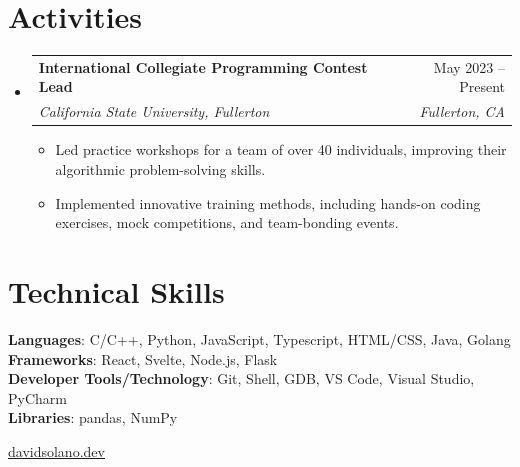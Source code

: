\documentclass[letterpaper,11pt]{article}
\makeatletter
\newcommand{\resumeItem}[1]{
  \item\small{
    {#1 \vspace{-2pt}}
  }
}
\newcommand{\resumeSubheading}[4]{
  \vspace{-2pt}\item
    \begin{tabular*}{0.97\textwidth}[t]{l@{\extracolsep{\fill}}r}
      \textbf{#1} & #2 \\
      \textit{\small#3} & \textit{\small #4} \\
    \end{tabular*}\vspace{-7pt}
}
\newcommand{\resumeSubHeadingListStart}{\begin{itemize}[leftmargin=0.15in, label={}]}
\newcommand{\resumeSubHeadingListEnd}{\end{itemize}}
\newcommand{\resumeItemListStart}{\begin{itemize}}
\newcommand{\resumeItemListEnd}{\end{itemize}\vspace{-5pt}}
\makeatother
\begin{document}
%
\section{Activities}
  \resumeSubHeadingListStart

    \resumeSubheading
      {International Collegiate Programming Contest Lead}{May 2023 -- Present}
      {California State University, Fullerton}{Fullerton, CA}
      \resumeItemListStart
        \resumeItem{Led practice workshops for a team of over 40 individuals, improving their algorithmic problem-solving skills.}
        \resumeItem{Implemented innovative training methods, including hands-on coding exercises, mock competitions, and team-bonding events.}
      \resumeItemListEnd

  \resumeSubHeadingListEnd
\section{Technical Skills}
 \begin{itemize}[leftmargin=0.15in, label={}]
    \small{\item{
     \textbf{Languages}{: C/C++, Python, JavaScript, Typescript, HTML/CSS, Java, Golang} \\
     \textbf{Frameworks}{: React, Svelte, Node.js, Flask} \\
     \textbf{Developer Tools/Technology}{: Git, Shell, GDB, VS Code, Visual Studio, PyCharm} \\
     \textbf{Libraries}{: pandas, NumPy}
    }}
 \end{itemize}

\begin{center}
  \small \vspace{10pt} \href{https://www.davidsolano.dev}{davidsolano.dev}
\end{center}
\end{document}
